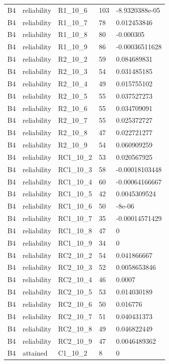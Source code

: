 \begin{longtable}{lllll}
B4 & reliability & R1\_10\_6 & 103 & -8.9320388e-05 \\
B4 & reliability & R1\_10\_7 & 78 & 0.012453846 \\
B4 & reliability & R1\_10\_8 & 80 & -0.000305 \\
B4 & reliability & R1\_10\_9 & 86 & -0.00036511628 \\
B4 & reliability & R2\_10\_2 & 59 & 0.084689831 \\
B4 & reliability & R2\_10\_3 & 54 & 0.031485185 \\
B4 & reliability & R2\_10\_4 & 49 & 0.015755102 \\
B4 & reliability & R2\_10\_5 & 55 & 0.037527273 \\
B4 & reliability & R2\_10\_6 & 55 & 0.034709091 \\
B4 & reliability & R2\_10\_7 & 55 & 0.025372727 \\
B4 & reliability & R2\_10\_8 & 47 & 0.022721277 \\
B4 & reliability & R2\_10\_9 & 54 & 0.060909259 \\
B4 & reliability & RC1\_10\_2 & 53 & 0.020567925 \\
B4 & reliability & RC1\_10\_3 & 58 & -0.00018103448 \\
B4 & reliability & RC1\_10\_4 & 60 & -0.00064166667 \\
B4 & reliability & RC1\_10\_5 & 42 & 0.0045309524 \\
B4 & reliability & RC1\_10\_6 & 50 & -8e-06 \\
B4 & reliability & RC1\_10\_7 & 35 & -0.00014571429 \\
B4 & reliability & RC1\_10\_8 & 47 & 0 \\
B4 & reliability & RC1\_10\_9 & 34 & 0 \\
B4 & reliability & RC2\_10\_2 & 54 & 0.041866667 \\
B4 & reliability & RC2\_10\_3 & 52 & 0.0058653846 \\
B4 & reliability & RC2\_10\_4 & 46 & 0.0007 \\
B4 & reliability & RC2\_10\_5 & 53 & 0.014030189 \\
B4 & reliability & RC2\_10\_6 & 50 & 0.016776 \\
B4 & reliability & RC2\_10\_7 & 51 & 0.040431373 \\
B4 & reliability & RC2\_10\_8 & 49 & 0.046822449 \\
B4 & reliability & RC2\_10\_9 & 47 & 0.0046489362 \\
B4 & attained & C1\_10\_2 & 8 & 0 \\

\end{longtable}

